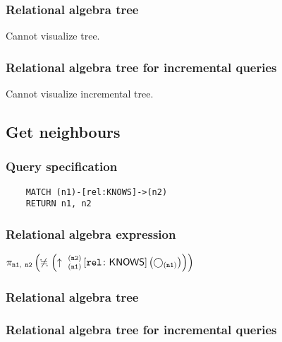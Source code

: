 	\subsubsection*{Relational algebra tree}

	Cannot visualize tree.

	\subsubsection*{Relational algebra tree for incremental queries}

	Cannot visualize incremental tree.
	\subsection{Get neighbours}

	\subsubsection*{Query specification}

	\begin{lstlisting}
	MATCH (n1)-[rel:KNOWS]->(n2)
	RETURN n1, n2
	\end{lstlisting}


	\subsubsection*{Relational algebra expression}

	$\projection{\var{n1},~\var{n2}} \left(\alldifferent{} \left(\expandout{n1}{n2}{}{rel}{KNOWS} \left(\getvertices{n1}{}\right)\right)\right)$

	\subsubsection*{Relational algebra tree}


	\subsubsection*{Relational algebra tree for incremental queries}

